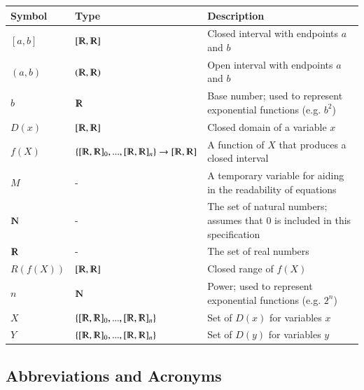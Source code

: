 \documentclass[12pt]{article}
\begin{document}
\renewcommand{\arraystretch}{1.2}
\noindent \begin{longtable*}{m{1.5cm} m{5.3cm} m{8.2cm}} \toprule
\textbf{Symbol}  & \textbf{Type} & \textbf{Description}\\
\midrule 
$[a,b]$ & $[\varmathbb{R}, \varmathbb{R}]$ & Closed interval with endpoints $a$ 
and $b$\\
$(a,b)$ & $(\varmathbb{R}, \varmathbb{R})$ & Open interval with endpoints $a$ 
and $b$\\
$b$ & $\varmathbb{R}$ & Base number; used to represent 
exponential functions (e.g. $b^2$)\\
$D(x)$ & $[\varmathbb{R}, \varmathbb{R}]$ & Closed domain of a variable $x$\\
$f(X)$ & $\{[\varmathbb{R}, \varmathbb{R}]_0, ..., [\varmathbb{R}, 
\varmathbb{R}]_n\} \rightarrow [\varmathbb{R}, 
\varmathbb{R}]$ & A function of $X$ that produces a closed interval\\
$M$ & - & A temporary variable for aiding in the readability of equations\\
$\varmathbb{N}$ & - & The set of natural numbers; assumes that $0$ is included 
in this specification\\
$\varmathbb{R}$ & - & The set of real numbers\\
$R(f(X))$ & $[\varmathbb{R}, \varmathbb{R}]$ & Closed range of $f(X)$\\
$n$ & $\varmathbb{N}$ & Power; used to represent exponential functions (e.g. 
$2^n$) \\
$X$ & $\{[\varmathbb{R}, \varmathbb{R}]_0, ..., [\varmathbb{R}, 
\varmathbb{R}]_n\}$ & Set of $D(x)$ for variables $x$\\
$Y$ & $\{[\varmathbb{R}, \varmathbb{R}]_0, ..., [\varmathbb{R}, 
\varmathbb{R}]_n\}$ & Set of $D(y)$ for variables $y$\\
\bottomrule
\end{longtable*}


\subsection{Abbreviations and Acronyms}
\end{document}
